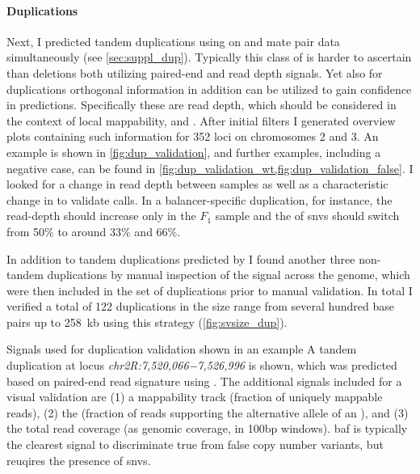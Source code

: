 \paragraph{Duplications} Next, I predicted tandem duplications using \delly
on \wgs and mate pair data simultaneously (see
\cref{sec:suppl_dup}). Typically this class of \sv is harder to
ascertain than deletions both utilizing paired-end and read depth signals.
Yet also for duplications orthogonal information in addition can be utilized to
gain confidence in predictions. Specifically these are read depth, which should
be considered in the context of local mappability, and \baf.
After initial filters I generated overview plots containing such information for
352 loci on chromosomes 2 and 3. An example is shown in
\cref{fig:dup_validation}, and further examples, including a negative case, can
be found in \cref{fig:dup_validation_wt,fig:dup_validation_false}.
I looked for a change in read depth between samples as well as a characteristic
change in \baf to validate calls. In a
balancer-specific duplication, for instance, the read-depth should increase only
in the $F_1$ sample and the \baf of \acp{snv} should switch from
50\% to around 33\% and 66\%.

In addition to tandem duplications predicted by \delly I found another three
non-tandem duplications by manual inspection of the \baf signal
across the genome, which were then included in the set of duplications prior
to manual validation. In total I verified a total of 122
duplications in the size range from several hundred base pairs up to 258~kb
using this strategy (\cref{fig:svsize_dup}).

    {Signals used for duplication validation shown in an example}
    {A tandem duplication at locus \textit{chr2R:7,520,066−7,526,996} is shown,
    which was predicted based on paired-end read signature using \delly.
    The additional signals
    included for a visual validation are (1) a mappability track (fraction
    of uniquely mappable reads), (2) the \baf (fraction of
    reads supporting the alternative allele of an \snv), and (3)
    the total read coverage (as genomic coverage, in 100bp windows). \Ac{baf}
    is typically the clearest signal to discriminate true from false
    copy number variants, but reuqires the presence of \acp{snv}.}

